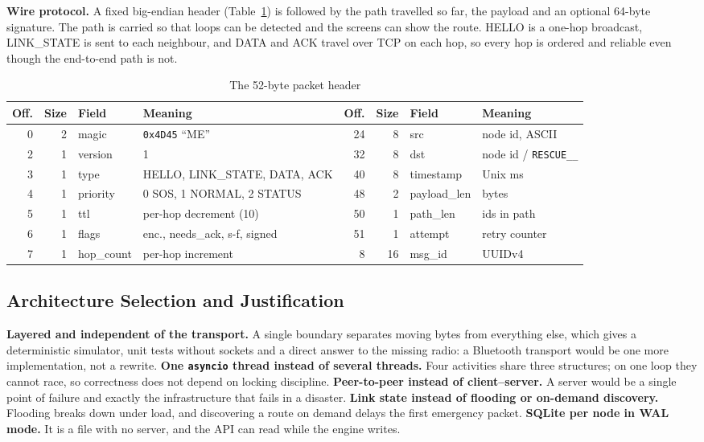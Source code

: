 \textbf{Wire protocol.} A fixed big-endian header (Table~\ref{tab:header}) is followed by the path travelled so far, the payload and an optional 64-byte signature. The path is carried so that loops can be detected and the screens can show the route. HELLO is a one-hop broadcast, LINK\_STATE is sent to each neighbour, and DATA and ACK travel over TCP on each hop, so every hop is ordered and reliable even though the end-to-end path is not.
\begin{table}[!htbp]
\caption{The 52-byte packet header}
\label{tab:header}
\footnotesize
\setlength{\tabcolsep}{3.5pt}
\begin{tabular}{@{}rrll@{\hspace{8pt}}rrll@{}}
\toprule
\textbf{Off.} & \textbf{Size} & \textbf{Field} & \textbf{Meaning} & \textbf{Off.} & \textbf{Size} & \textbf{Field} & \textbf{Meaning}\\ \midrule
0 & 2 & magic & \texttt{0x4D45} ``ME'' & 24 & 8 & src & node id, ASCII\\
2 & 1 & version & 1 & 32 & 8 & dst & node id / \texttt{RESCUE\_\_}\\
3 & 1 & type & HELLO, LINK\_STATE, DATA, ACK & 40 & 8 & timestamp & Unix ms\\
4 & 1 & priority & 0 SOS, 1 NORMAL, 2 STATUS & 48 & 2 & payload\_len & bytes\\
5 & 1 & ttl & per-hop decrement (10) & 50 & 1 & path\_len & ids in path\\
6 & 1 & flags & enc., needs\_ack, s-f, signed & 51 & 1 & attempt & retry counter\\
7 & 1 & hop\_count & per-hop increment & 8 & 16 & msg\_id & UUIDv4\\
\bottomrule
\end{tabular}
\end{table}

\subsection{Architecture Selection and Justification}
\textbf{Layered and independent of the transport.} A single boundary separates moving bytes from everything else, which gives a deterministic simulator, unit tests without sockets and a direct answer to the missing radio: a Bluetooth transport would be one more implementation, not a rewrite. \textbf{One \texttt{asyncio} thread instead of several threads.} Four activities share three structures; on one loop they cannot race, so correctness does not depend on locking discipline. \textbf{Peer-to-peer instead of client--server.} A server would be a single point of failure and exactly the infrastructure that fails in a disaster. \textbf{Link state instead of flooding or on-demand discovery.} Flooding breaks down under load, and discovering a route on demand delays the first emergency packet. \textbf{SQLite per node in WAL mode.} It is a file with no server, and the API can read while the engine writes.

